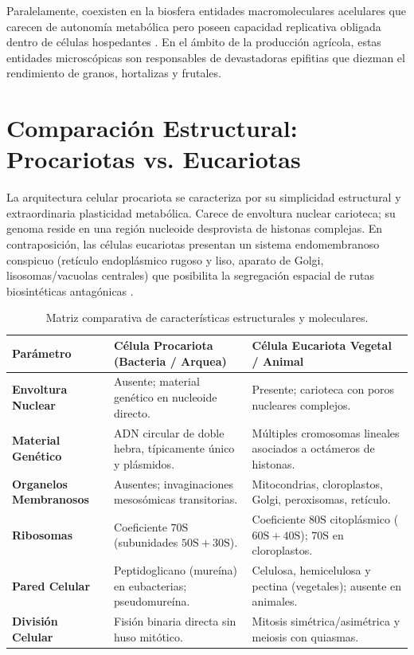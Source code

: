 \documentclass[spanish,letterpaper,oneside]{article}
\begin{document}
Paralelamente, coexisten en la biosfera entidades macromoleculares acelulares que carecen de autonomía metabólica pero poseen capacidad replicativa obligada dentro de células hospedantes \parencite{karp2014}. En el ámbito de la producción agrícola, estas entidades microscópicas son responsables de devastadoras epifitias que diezman el rendimiento de granos, hortalizas y frutales.

\section{Comparación Estructural: Procariotas vs. Eucariotas}
La arquitectura celular procariota se caracteriza por su simplicidad estructural y extraordinaria plasticidad metabólica. Carece de envoltura nuclear carioteca; su genoma reside en una región nucleoide desprovista de histonas complejas. En contraposición, las células eucariotas presentan un sistema endomembranoso conspicuo (retículo endoplásmico rugoso y liso, aparato de Golgi, lisosomas/vacuolas centrales) que posibilita la segregación espacial de rutas biosintéticas antagónicas \parencite{alberts2015, taiz2015}.

\begin{table}[h!]
\centering
\small
\begin{tabularx}{\textwidth}{lYY}
\toprule
\textbf{Parámetro} & \textbf{Célula Procariota (Bacteria / Arquea)} & \textbf{Célula Eucariota Vegetal / Animal} \\
\midrule
\textbf{Envoltura Nuclear} & Ausente; material genético en nucleoide directo. & Presente; carioteca con poros nucleares complejos. \\
\textbf{Material Genético} & ADN circular de doble hebra, típicamente único y plásmidos. & Múltiples cromosomas lineales asociados a octámeros de histonas. \\
\textbf{Organelos Membranosos} & Ausentes; invaginaciones mesosómicas transitorias. & Mitocondrias, cloroplastos, Golgi, peroxisomas, retículo. \\
\textbf{Ribosomas} & Coeficiente $70\text{S}$ (subunidades $50\text{S} + 30\text{S}$). & Coeficiente $80\text{S}$ citoplásmico ($60\text{S} + 40\text{S}$); $70\text{S}$ en cloroplastos. \\
\textbf{Pared Celular} & Peptidoglicano (mureína) en eubacterias; pseudomureína. & Celulosa, hemicelulosa y pectina (vegetales); ausente en animales. \\
\textbf{División Celular} & Fisión binaria directa sin huso mitótico. & Mitosis simétrica/asimétrica y meiosis con quiasmas. \\
\bottomrule
\end{tabularx}
\caption{Matriz comparativa de características estructurales y moleculares.}
\end{table}
\end{document}

